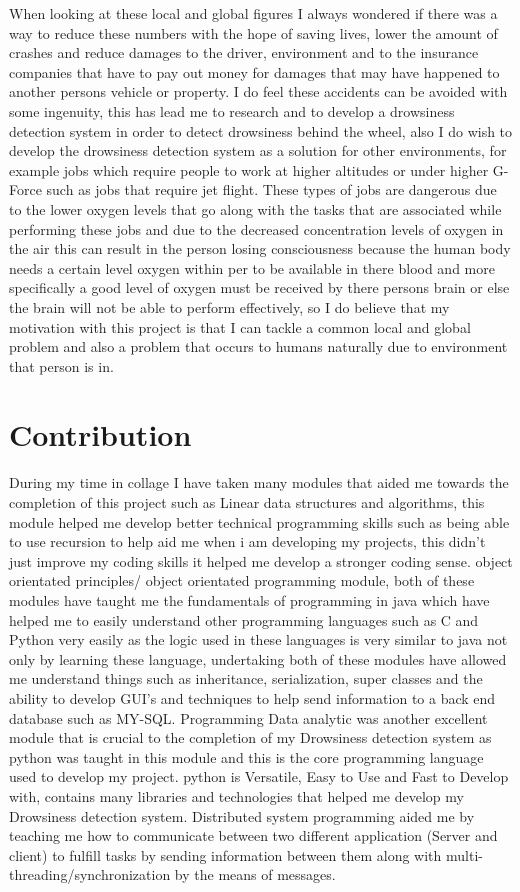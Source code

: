When looking at these local and global figures I always wondered if there was a way to reduce these numbers with the hope of saving lives, lower the amount of crashes and reduce damages to the driver, environment and to the insurance companies that have to pay out money for damages that may have happened to another persons vehicle or property. I do feel these accidents can be avoided with some ingenuity, this has lead me to research and to develop a drowsiness detection system in order to detect drowsiness behind the wheel, also I do wish to develop the drowsiness detection system as a solution for other environments, for example jobs which require people to work at higher altitudes or under higher G-Force such as jobs that require jet flight. These types of jobs are dangerous due to the lower oxygen levels that go along with the tasks that are associated while performing these jobs and due to the decreased concentration levels of oxygen in the air this can result in the person losing consciousness because the human body needs a certain level oxygen within per to be available in there blood and more specifically a good level of oxygen must be received by there persons brain or else the brain will not be able to perform effectively, so I do believe that my motivation with this project is that I can tackle a common local and global problem and also a problem that occurs to humans naturally due to environment that person is in.
\section{Contribution}
During my time in collage I have  taken many modules that aided me towards  the completion of this project such as Linear data structures and algorithms, this module helped me develop better technical programming skills such as being able to use recursion to help aid me when i am developing my projects, this didn't just improve my coding skills it helped me develop a stronger coding sense. object orientated principles/ object orientated programming module,  both of these modules have taught me the fundamentals of programming in java which have helped me to easily understand other programming languages such as C and Python very easily as the logic used in these languages is very similar to java not only by learning these language, undertaking both of these modules have allowed me understand things such as inheritance, serialization, super classes and the ability to develop GUI's and techniques to help send information to a back end database such as MY-SQL. Programming Data analytic was another excellent module that is crucial to the completion of my Drowsiness detection system as python was taught in this module and this is the core programming language used to develop my project. python is Versatile, Easy to Use and Fast to Develop with, contains many libraries and technologies that helped me develop my Drowsiness detection system. Distributed system programming aided me by teaching me how to communicate between two different application (Server and client)  to fulfill tasks by sending information between them along with multi-threading/synchronization by the means of messages. 

